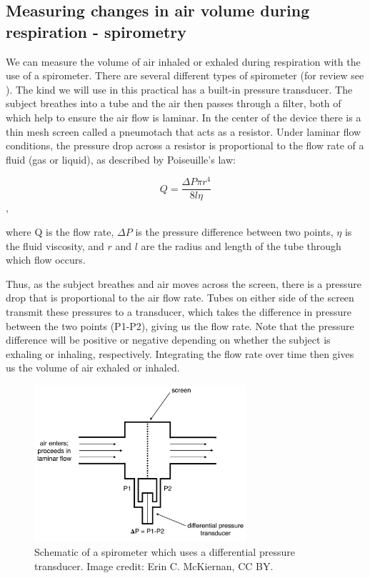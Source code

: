 \documentclass[12pt]{article}
\begin{document}
\subsection*{Measuring changes in air volume during respiration - spirometry}

We can measure the volume of air inhaled or exhaled during respiration with the use of a spirometer. There are several different types of spirometer (for review see \cite{schlegelmilch2011pulmonary}). The kind we will use in this practical has a built-in pressure transducer. The subject breathes into a tube and the air then passes through a filter, both of which help to ensure the air flow is laminar. In the center of the device there is a thin mesh screen called a pneumotach that acts as a resistor. Under laminar flow conditions, the pressure drop across a resistor is proportional to the flow rate of a fluid (gas or liquid), as described by Poiseuille's law:

\begin{equation}
Q=\frac{\Delta P \pi r^{4}}{8 l \eta}
\label{eq:presion}
\end{equation},

where Q is the flow rate, $\Delta P$ is the pressure difference between two points, $\eta$ is the fluid viscosity, and $r$ and $l$ are the radius and length of the tube through which flow occurs. 

Thus, as the subject breathes and air moves across the screen, there is a pressure drop that is proportional to the air flow rate. Tubes on either side of the screen transmit these pressures to a transducer, which takes the difference in pressure between the two points (P1-P2), giving us the flow rate. Note that the pressure difference will be positive or negative depending on whether the subject is exhaling or inhaling, respectively. Integrating the flow rate over time then gives us the volume of air exhaled or inhaled.  
\begin{figure}[h!]
\centering
\includegraphics[width=0.7\textwidth]{images/pneumotach.png}
\caption{Schematic of a spirometer which uses a differential pressure transducer. Image credit: Erin C. McKiernan, CC BY.}
\label{fig:pneumotach}
\end{figure}
\end{document}
